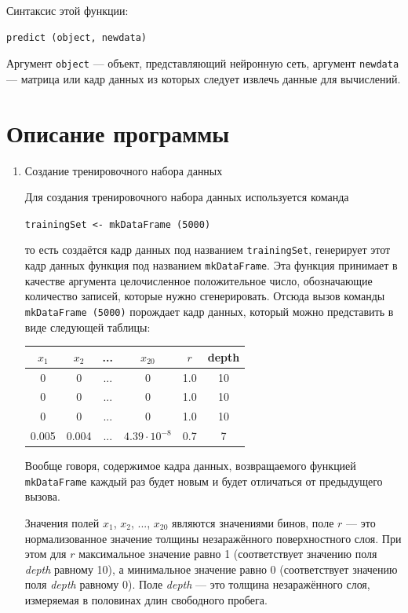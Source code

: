 \documentclass[12pt]{article}
\begin{document}
  Синтаксис этой функции:

\begin{verbatim}
predict (object, newdata)
\end{verbatim}

  Аргумент \verb|object| --- объект, представляющий нейронную сеть, аргумент \verb|newdata| --- матрица или кадр данных из которых следует извлечь данные для вычислений.

  \section{Описание программы}
  
\begin{enumerate}

\item {Создание тренировочного набора данных}

  Для создания тренировочного набора данных используется команда

  \verb|trainingSet <- mkDataFrame (5000)|

  то есть создаётся кадр данных под названием \verb|trainingSet|, генерирует этот кадр данных функция под названием \verb|mkDataFrame|. Эта функция принимает в качестве аргумента целочисленное положительное число, обозначающие количество записей, которые нужно сгенерировать. Отсюда вызов команды \verb|mkDataFrame (5000)| порождает кадр данных, который можно представить в виде следующей таблицы:

  \begin{tabular}{|c|c|c|c|c|c|}
    \hline
    $x_1$ & $x_2$ & ... & $x_{20}$ & $r$ & depth \\ \hline
    0 & 0 & ... & 0 & 1.0 & 10 \\ \hline
    0 & 0 & ... & 0 & 1.0 & 10 \\ \hline
    0 & 0 & ... & 0 & 1.0 & 10 \\ \hline
    0.005 & 0.004 & ... & $4.39 \cdot 10^{-8}$ & 0.7 & 7 \\ \hline
  \end{tabular}

  Вообще говоря, содержимое кадра данных, возвращаемого функцией \verb|mkDataFrame| каждый раз будет новым и будет отличаться от предыдущего вызова.

  Значения полей $x_1$, $x_2$, $...$, $x_{20}$ являются значениями бинов, поле $r$ --- это нормализованное значение толщины незаражённого поверхностного слоя. При этом для $r$ максимальное значение равно 1 (соответствует значению поля \emph{depth} равному 10), а минимальное значение равно 0 (соответствует значению поля \emph{depth} равному 0). Поле \emph{depth} --- это толщина незаражённого слоя, измеряемая в половинах длин свободного пробега.


\end{enumerate}
\end{document}
